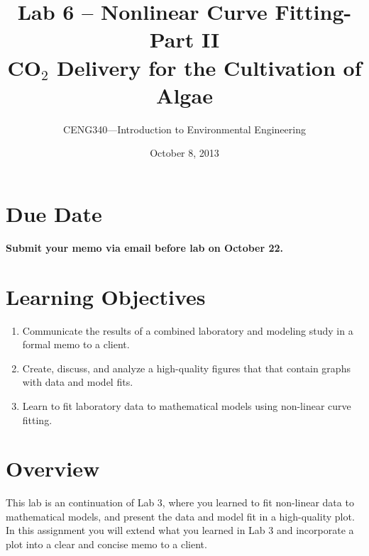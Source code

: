 \documentclass[12pt,letterpaper]{article}
\begin{document}
\setlength{\parindent}{0cm} 


\frenchspacing

\title {\textbf{Lab 6 -- Nonlinear Curve Fitting-Part II} \\ \vspace{2 mm} {\large \textbf{CO$_2$ Delivery for the Cultivation of Algae}}}

\author {CENG340---Introduction to Environmental Engineering}
\date {October 8, 2013}
\maketitle

\section *{Due Date}
\textbf{Submit your memo via email before lab on October 22.}
\section *{Learning Objectives}
\begin{enumerate}

\item Communicate the results of a combined laboratory and modeling study in a formal memo to a client.\ 
\item Create, discuss, and analyze a high-quality figures that that contain graphs with data and model fits.\
\item Learn to fit laboratory data to mathematical models using non-linear curve fitting.\


\end{enumerate}

\section *{Overview}
This lab is an continuation of Lab 3, where you learned to fit non-linear data to mathematical models, and present the data and model fit in a high-quality plot.  In this assignment you will extend what you learned in Lab 3 and incorporate a plot into a clear and concise memo to a client. 
\end{document}
